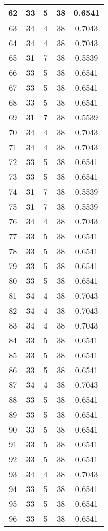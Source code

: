 \documentclass[letterpaper, 12pt]{article}
\begin{document}
\begin{longtable}{|c|c|c|c|c|}
\hline
62 & 33 & 5 & 38 & 0.6541 \\
\hline
63 & 34 & 4 & 38 & 0.7043 \\
\hline
64 & 34 & 4 & 38 & 0.7043 \\
\hline
65 & 31 & 7 & 38 & 0.5539 \\
\hline
66 & 33 & 5 & 38 & 0.6541 \\
\hline
67 & 33 & 5 & 38 & 0.6541 \\
\hline
68 & 33 & 5 & 38 & 0.6541 \\
\hline
69 & 31 & 7 & 38 & 0.5539 \\
\hline
70 & 34 & 4 & 38 & 0.7043 \\
\hline
71 & 34 & 4 & 38 & 0.7043 \\
\hline
72 & 33 & 5 & 38 & 0.6541 \\
\hline
73 & 33 & 5 & 38 & 0.6541 \\
\hline
74 & 31 & 7 & 38 & 0.5539 \\
\hline
75 & 31 & 7 & 38 & 0.5539 \\
\hline
76 & 34 & 4 & 38 & 0.7043 \\
\hline
77 & 33 & 5 & 38 & 0.6541 \\
\hline
78 & 33 & 5 & 38 & 0.6541 \\
\hline
79 & 33 & 5 & 38 & 0.6541 \\
\hline
80 & 33 & 5 & 38 & 0.6541 \\
\hline
81 & 34 & 4 & 38 & 0.7043 \\
\hline
82 & 34 & 4 & 38 & 0.7043 \\
\hline
83 & 34 & 4 & 38 & 0.7043 \\
\hline
84 & 33 & 5 & 38 & 0.6541 \\
\hline
85 & 33 & 5 & 38 & 0.6541 \\
\hline
86 & 33 & 5 & 38 & 0.6541 \\
\hline
87 & 34 & 4 & 38 & 0.7043 \\
\hline
88 & 33 & 5 & 38 & 0.6541 \\
\hline
89 & 33 & 5 & 38 & 0.6541 \\
\hline
90 & 33 & 5 & 38 & 0.6541 \\
\hline
91 & 33 & 5 & 38 & 0.6541 \\
\hline
92 & 33 & 5 & 38 & 0.6541 \\
\hline
93 & 34 & 4 & 38 & 0.7043 \\
\hline
94 & 33 & 5 & 38 & 0.6541 \\
\hline
95 & 33 & 5 & 38 & 0.6541 \\
\hline
96 & 33 & 5 & 38 & 0.6541 \\

\end{longtable}
\end{document}
